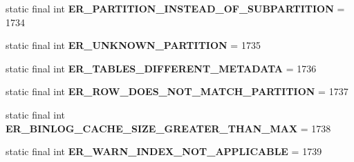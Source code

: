 \begin{DoxyCompactItemize}
\item 
\mbox{\label{classcom_1_1mysql_1_1cj_1_1exceptions_1_1_mysql_error_numbers_ab09f5993f1dac04e3dff7af1b8082d84}} 
static final int {\bfseries E\+R\+\_\+\+P\+A\+R\+T\+I\+T\+I\+O\+N\+\_\+\+I\+N\+S\+T\+E\+A\+D\+\_\+\+O\+F\+\_\+\+S\+U\+B\+P\+A\+R\+T\+I\+T\+I\+ON} = 1734
\item 
\mbox{\label{classcom_1_1mysql_1_1cj_1_1exceptions_1_1_mysql_error_numbers_aefb681dde5d58aa914013809c8bf3607}} 
static final int {\bfseries E\+R\+\_\+\+U\+N\+K\+N\+O\+W\+N\+\_\+\+P\+A\+R\+T\+I\+T\+I\+ON} = 1735
\item 
\mbox{\label{classcom_1_1mysql_1_1cj_1_1exceptions_1_1_mysql_error_numbers_a9634a2f73cb786af940fca598526c1cf}} 
static final int {\bfseries E\+R\+\_\+\+T\+A\+B\+L\+E\+S\+\_\+\+D\+I\+F\+F\+E\+R\+E\+N\+T\+\_\+\+M\+E\+T\+A\+D\+A\+TA} = 1736
\item 
\mbox{\label{classcom_1_1mysql_1_1cj_1_1exceptions_1_1_mysql_error_numbers_a9ee090b2b185c8d817e3cfcfa435cdd1}} 
static final int {\bfseries E\+R\+\_\+\+R\+O\+W\+\_\+\+D\+O\+E\+S\+\_\+\+N\+O\+T\+\_\+\+M\+A\+T\+C\+H\+\_\+\+P\+A\+R\+T\+I\+T\+I\+ON} = 1737
\item 
\mbox{\label{classcom_1_1mysql_1_1cj_1_1exceptions_1_1_mysql_error_numbers_a1bccde6009becdcb469bf015d68f6544}} 
static final int {\bfseries E\+R\+\_\+\+B\+I\+N\+L\+O\+G\+\_\+\+C\+A\+C\+H\+E\+\_\+\+S\+I\+Z\+E\+\_\+\+G\+R\+E\+A\+T\+E\+R\+\_\+\+T\+H\+A\+N\+\_\+\+M\+AX} = 1738
\item 
\mbox{\label{classcom_1_1mysql_1_1cj_1_1exceptions_1_1_mysql_error_numbers_a6e257837035b0a6b3670a4a8ce0fefad}} 
static final int {\bfseries E\+R\+\_\+\+W\+A\+R\+N\+\_\+\+I\+N\+D\+E\+X\+\_\+\+N\+O\+T\+\_\+\+A\+P\+P\+L\+I\+C\+A\+B\+LE} = 1739
\item 
\mbox{\label{classcom_1_1mysql_1_1cj_1_1exceptions_1_1_mysql_error_numbers_a4ad06df0ef405c7ef9af7fe037bf2bd5}} 

\end{DoxyCompactItemize}

